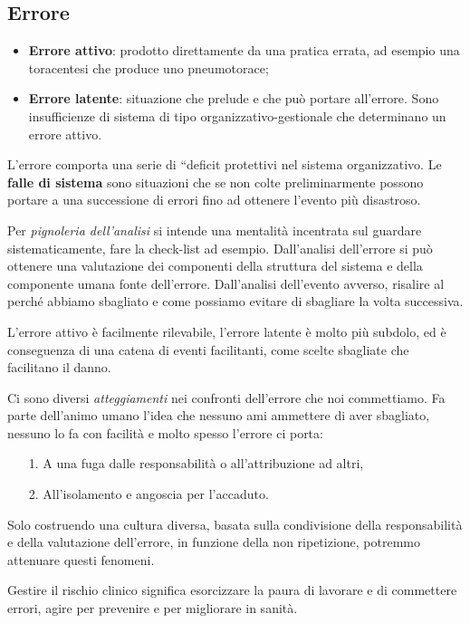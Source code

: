 \subsection{Errore}

\begin{itemize}
\item
  \textbf{Errore attivo}: prodotto direttamente da una pratica errata,
  ad esempio una toracentesi che produce uno pneumotorace;
\item
  \textbf{Errore latente}: situazione che prelude e che può portare
  all'errore. Sono insufficienze di sistema di tipo
  organizzativo-gestionale che determinano un errore attivo.
\end{itemize}

L'errore comporta una serie di ``deficit protettivi nel sistema
organizzativo. Le \textbf{falle di sistema} sono situazioni che se non
colte preliminarmente possono portare a una successione di errori fino
ad ottenere l'evento più disastroso.

Per \emph{pignoleria dell'analisi} si intende una mentalità incentrata
sul guardare sistematicamente, fare la check-list ad esempio.
Dall'analisi dell'errore si può ottenere una valutazione dei componenti
della struttura del sistema e della componente umana fonte dell'errore.
Dall'analisi dell'evento avverso, risalire al perché abbiamo sbagliato e
come possiamo evitare di sbagliare la volta successiva.

L'errore attivo è facilmente rilevabile, l'errore latente è molto più
subdolo, ed è conseguenza di una catena di eventi facilitanti, come
scelte sbagliate che facilitano il danno.

Ci sono diversi \emph{atteggiamenti} nei confronti dell'errore che noi
commettiamo. Fa parte dell'animo umano l'idea che nessuno ami ammettere
di aver sbagliato, nessuno lo fa con facilità e molto spesso l'errore ci
porta:

\begin{itemize}
\item[1.]
  A una fuga dalle responsabilità o all'attribuzione ad altri,
\item[2.]
  All'isolamento e angoscia per l'accaduto.
\end{itemize}

Solo costruendo una cultura diversa, basata sulla condivisione della
responsabilità e della valutazione dell'errore, in funzione della non
ripetizione, potremmo attenuare questi fenomeni.

Gestire il rischio clinico significa esorcizzare la paura di lavorare e
di commettere errori, agire per prevenire e per migliorare in sanità.

